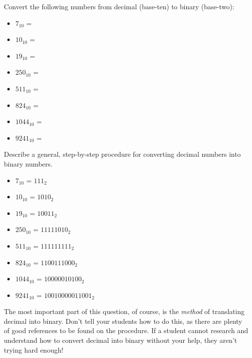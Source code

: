 

Convert the following numbers from decimal (base-ten) to binary (base-two):

\begin{itemize}
\item{} $7_{10}$ =
\vskip 5pt
\item{} $10_{10}$ =
\vskip 5pt
\item{} $19_{10}$ =
\vskip 5pt
\item{} $250_{10}$ =
\vskip 5pt
\item{} $511_{10}$ =
\vskip 5pt
\item{} $824_{10}$ =
\vskip 5pt
\item{} $1044_{10}$ =
\vskip 5pt
\item{} $9241_{10}$ =
\end{itemize}

Describe a general, step-by-step procedure for converting decimal numbers into binary numbers.







\begin{itemize}
\item{} $7_{10}$ = $111_2$
\vskip 5pt
\item{} $10_{10}$ = $1010_2$
\vskip 5pt
\item{} $19_{10}$ = $10011_2$
\vskip 5pt
\item{} $250_{10}$ = $11111010_2$
\vskip 5pt
\item{} $511_{10}$ = $111111111_2$
\vskip 5pt
\item{} $824_{10}$ = $1100111000_2$
\vskip 5pt
\item{} $1044_{10}$ = $10000010100_2$
\vskip 5pt
\item{} $9241_{10}$ = $10010000011001_2$
\end{itemize}







The most important part of this question, of course, is the {\it method} of translating decimal into binary.  Don't tell your students how to do this, as there are plenty of good references to be found on the procedure.  If a student cannot research and understand how to convert decimal into binary without your help, they aren't trying hard enough!




